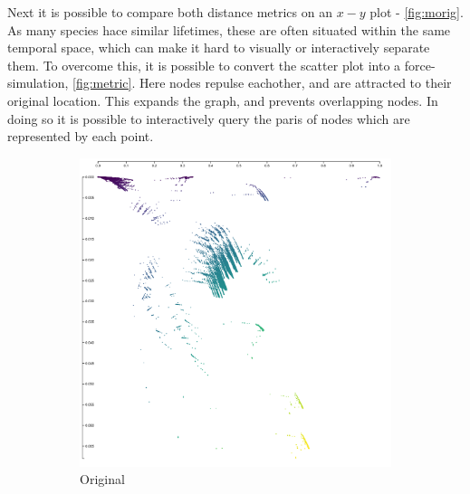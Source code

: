 Next it is possible to compare both distance metrics on an $x-y$ plot -  \autoref{fig:morig}. As many species hace similar lifetimes, these are often situated within the same temporal space, which can make it hard to visually or interactively separate them. To overcome this, it is possible to convert the scatter plot into a force-simulation, \autoref{fig:metric}. Here nodes repulse eachother, and are attracted to their original location. This expands the graph, and prevents overlapping nodes. In doing so it is possible to interactively query the paris of nodes which are represented by each point.



\begin{figure}[H]
\begin{subfigure}[t]{.5\textwidth}
  \centering
  \includegraphics[width=\textwidth]{fig/metric-1.png}
  \caption{Original}
  \label{fig:morig}
\end{subfigure}%
\begin{subfigure}[t]{.5\textwidth}

\end{subfigure}
\end{figure}
